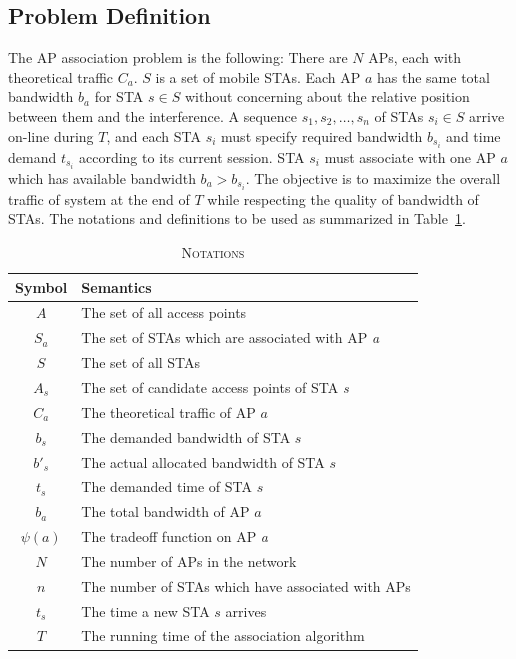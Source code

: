 \documentclass[conference]{IEEEtran}
\begin{document}
  \subsection{Problem Definition}
  The AP association problem is the following:  There are $N$ APs, each with theoretical traffic $C_a$.  $S$ is a set of mobile STAs.  Each AP $a$ has the same total bandwidth $b_a$ for STA $s\in S$ without concerning about the relative position between them and the interference.  A sequence $s_1,s_2,\ldots,s_n$ of STAs $s_i\in S$ arrive on-line during $T$, and each STA $s_i$ must specify required bandwidth $b_{s_i}$ and time demand $t_{s_i}$ according to its current session.  STA $s_i$ must associate with one AP $a$ which has available bandwidth $b_a>b_{s_i}$.  The objective is to maximize the overall traffic of system at the end of $T$ while respecting the quality of bandwidth of STAs.  The notations and definitions to be used as summarized in Table~\ref{tb:notation}.
\begin{table}[!ht]
  \centering
  \caption{{\scshape Notations}}\label{tb:notation}
    \begin{tabular}{|c|p{6cm}|}
    \hline
    {\bf Symbol}& \hfil{\bf Semantics}\hfil \\
    \hline
    $A$ & The set of all access points \\
    \hline
    $S_a$ & The set of STAs which are associated with AP \textit{a}\\
    \hline
    $S$ & The set of all STAs \\
    \hline
    $A_s$ & The set of candidate access points of STA \textit{s} \\
    \hline
    $C_a$ & The theoretical traffic of AP $a$ \\
    \hline
    $b_s$ & The demanded bandwidth of STA $s$\\
    \hline
    $b'_s$ & The actual allocated bandwidth of STA $s$\\
    \hline
    $t_s$ & The demanded time of STA $s$\\
    \hline
    $b_a$ & The total bandwidth of AP $a$\\
    \hline
    $\psi(a)$ & The trade\-off function on AP \textit{a}\\
    \hline
    $N$ & The number of APs in the network\\
    \hline
    $n$ & The number of STAs which have associated with APs\\
    \hline
    $t_s$ & The time a new STA $s$ arrives\\
    \hline
    $T$ & The running time of the association algorithm\\
    \hline
    \end{tabular}
  \end{table}
\end{document}
